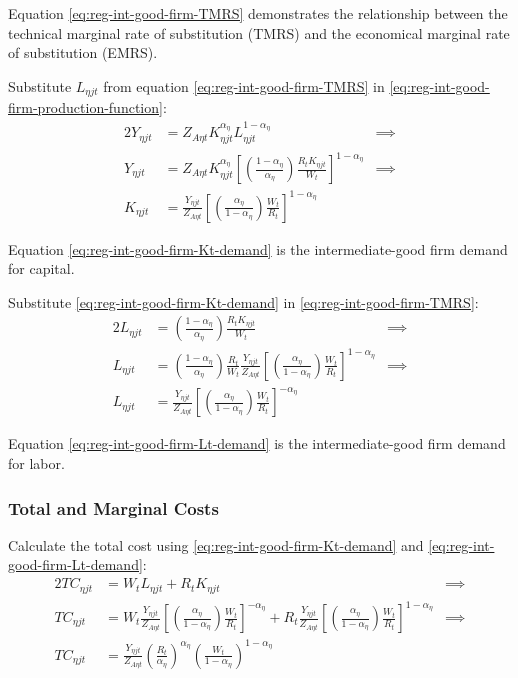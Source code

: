 \documentclass[
	thesis.tex
	]{subfiles}
\begin{document}
Equation \ref{eq:reg-int-good-firm-TMRS} demonstrates the relationship between the technical marginal rate of substitution (TMRS) and the economical marginal rate of substitution (EMRS). 

Substitute $L_{\eta jt}$ from equation \ref{eq:reg-int-good-firm-TMRS} in \ref{eq:reg-int-good-firm-production-function}:
\begin{alignat}{2}
	Y_{\eta jt} & = Z_{A\eta t} K_{\eta jt}^{\alpha_\eta} L_{\eta jt}^{1-{\alpha_\eta}} &\implies \nonumber \\
	Y_{\eta jt} & = Z_{A\eta t} K_{\eta jt}^{\alpha_\eta} \left[ \left( \frac{1-{\alpha_\eta}}{{\alpha_\eta}} \right) \frac{R_t K_{\eta jt}}{W_t} \right]^{1-{\alpha_\eta}} &\implies \nonumber \\
	K_{\eta jt} & = \frac{Y_{\eta jt}}{Z_{A\eta t}} \left[ \left( \frac{{\alpha_\eta}}{1-{\alpha_\eta}} \right) \frac{W_t}{R_t}\right]^{1-{\alpha_\eta}} \label{eq:reg-int-good-firm-Kt-demand}
\end{alignat}

Equation \ref{eq:reg-int-good-firm-Kt-demand} is the intermediate-good firm demand for capital. 

Substitute \ref{eq:reg-int-good-firm-Kt-demand} in \ref{eq:reg-int-good-firm-TMRS}:
\begin{alignat}{2}
	L_{\eta jt} & = \left( \frac{1-{\alpha_\eta}}{{\alpha_\eta}} \right) \frac{R_t K_{\eta jt}}{W_t} &\implies \nonumber \\
	L_{\eta jt} & = \left( \frac{1-{\alpha_\eta}}{{\alpha_\eta}} \right) \frac{R_t}{W_t} \frac{Y_{\eta jt}}{Z_{A\eta t}} \left[ \left( \frac{{\alpha_\eta}}{1-{\alpha_\eta}} \right) \frac{W_t}{R_t}\right]^{1-{\alpha_\eta}} &\implies \nonumber \\
	L_{\eta jt} & = \frac{Y_{\eta jt}}{Z_{A\eta t}} \left[ \left( \frac{{\alpha_\eta}}{1-{\alpha_\eta}} \right) \frac{W_t}{R_t}\right]^{-{\alpha_\eta}} \label{eq:reg-int-good-firm-Lt-demand}
\end{alignat}

Equation \ref{eq:reg-int-good-firm-Lt-demand} is the intermediate-good firm demand for labor.

\subsubsection*{Total and Marginal Costs}

Calculate the total cost using \ref{eq:reg-int-good-firm-Kt-demand} and \ref{eq:reg-int-good-firm-Lt-demand}:
\begin{alignat}{2}
	TC_{\eta jt} & = W_t L_{\eta jt} + R_t K_{\eta jt} &\implies \nonumber \\
	TC_{\eta jt} & = W_t \frac{Y_{\eta jt}}{Z_{A\eta t}} \left[ \left( \frac{{\alpha_\eta}}{1-{\alpha_\eta}} \right) \frac{W_t}{R_t} \right]^{-{\alpha_\eta}} + R_t \frac{Y_{\eta jt}}{Z_{A\eta t}} \left[ \left( \frac{{\alpha_\eta}}{1-{\alpha_\eta}} \right) \frac{W_t}{R_t} \right]^{1-{\alpha_\eta}} &\implies \nonumber \\
	TC_{\eta jt} & = \frac{Y_{\eta jt}}{Z_{A\eta t}} \left( \frac{R_t}{{\alpha_\eta}} \right)^{{\alpha_\eta}} \left( \frac{W_t}{1-{\alpha_\eta}} \right)^{1-{\alpha_\eta}} \label{eq:reg-int-good-firm-TC}
\end{alignat}
\end{document}
